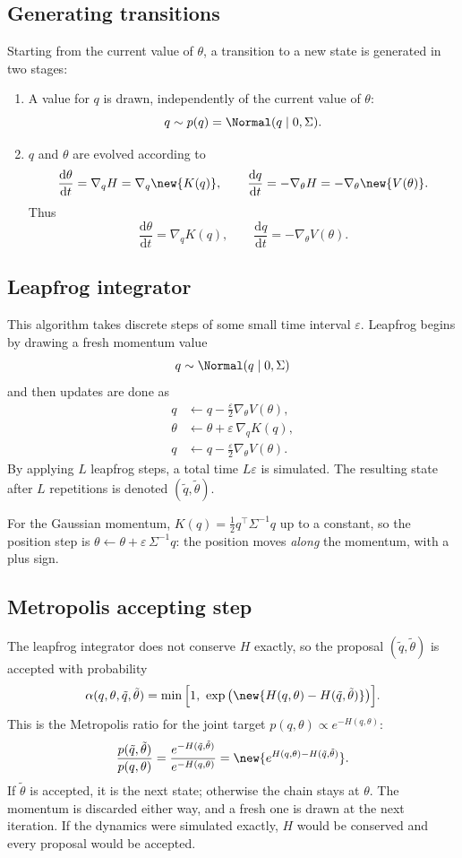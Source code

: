 \subsection{Generating transitions}
Starting from the current value of $\theta$, a transition to a new state is generated in two stages:
\begin{enumerate}
\item A value for $q$ is drawn, independently of the current value of $\theta$:
\[
q \sim p(q) = \Normal(q \mid 0, \Sigma).
\]
\item $q$ and $\theta$ are evolved according to
\[
\frac{\mathrm{d}\theta}{\mathrm{d}t} = \nabla_q H = \nabla_q \new{K(q)},
\qquad
\frac{\mathrm{d}q}{\mathrm{d}t} = -\nabla_\theta H = -\nabla_\theta \new{V(\theta)}.
\]
Thus
\[
\frac{\mathrm{d}\theta}{\mathrm{d}t} = \nabla_q K(q), \qquad \frac{\mathrm{d}q}{\mathrm{d}t} = -\nabla_\theta V(\theta).
\]
\end{enumerate}

\subsection{Leapfrog integrator}
This algorithm takes discrete steps of some small time interval $\varepsilon$. Leapfrog begins by drawing a fresh momentum value
\[
q \sim \Normal(q \mid 0, \Sigma)
\]
and then updates are done as
\begin{align*}
q &\leftarrow q - \frac{\varepsilon}{2}\nabla_\theta V(\theta),\\
\theta &\leftarrow \theta + \varepsilon\,\nabla_q K(q),\\
q &\leftarrow q - \frac{\varepsilon}{2}\nabla_\theta V(\theta).
\end{align*}
By applying $L$ leapfrog steps, a total time $L\varepsilon$ is simulated. The resulting state after $L$ repetitions is denoted $(\tilde q, \tilde\theta)$.

For the Gaussian momentum, $K(q) = \frac12 q^{\top}\Sigma^{-1}q$ up to a constant, so the position step is $\theta \leftarrow \theta + \varepsilon\,\Sigma^{-1}q$: the position moves \emph{along} the momentum, with a plus sign.

\subsection{Metropolis accepting step}
The leapfrog integrator does not conserve $H$ exactly, so the proposal $(\tilde q, \tilde\theta)$ is accepted with probability
\[
\alpha(q, \theta, \tilde q, \tilde\theta) = \min\Big[1,\ \exp\big(\new{H(q, \theta) - H(\tilde q, \tilde\theta)}\big)\Big].
\]
This is the Metropolis ratio for the joint target $p(q, \theta) \propto e^{-H(q, \theta)}$:
\[
\frac{p(\tilde q, \tilde\theta)}{p(q, \theta)} = \frac{e^{-H(\tilde q, \tilde\theta)}}{e^{-H(q, \theta)}} = \new{e^{H(q, \theta) - H(\tilde q, \tilde\theta)}}.
\]
If $\tilde\theta$ is accepted, it is the next state; otherwise the chain stays at $\theta$. The momentum is discarded either way, and a fresh one is drawn at the next iteration. If the dynamics were simulated exactly, $H$ would be conserved and every proposal would be accepted.

